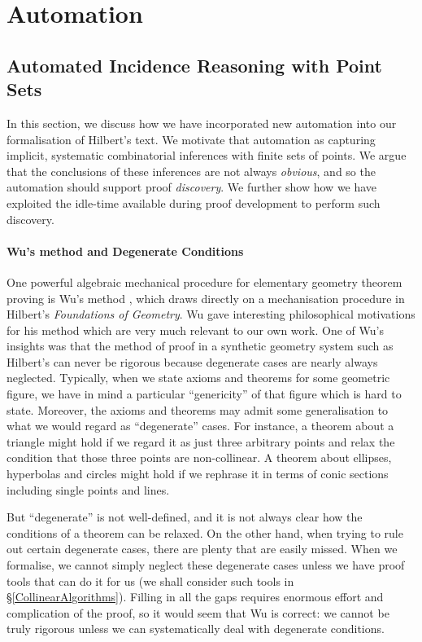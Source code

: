 \chapter{Automation}\label{chapter:Automation}
\section{Automated Incidence Reasoning with Point Sets}\label{sec:Incidence} 
In this section, we discuss how we have incorporated new automation into our formalisation of Hilbert's text. We motivate that automation as capturing implicit, systematic combinatorial inferences with finite sets of points. We argue that the conclusions of these inferences are not always \emph{obvious}, and so the automation should support proof \emph{discovery}. We further show how we have exploited the idle-time available during proof development to perform such discovery.

\subsubsection{Wu's method and Degenerate Conditions}\label{degeneracy}
One powerful algebraic mechanical procedure for elementary geometry theorem proving is Wu's method \cite{WuMechanicalTheoremProving}, which draws directly on a mechanisation procedure in Hilbert's \emph{Foundations of Geometry}. Wu gave interesting philosophical motivations for his method which are very much relevant to our own work. One of Wu's insights was that the method of proof in a synthetic geometry system such as Hilbert's can never be rigorous because degenerate cases are nearly always neglected. Typically, when we state axioms and theorems for some geometric figure, we have in mind a particular ``genericity'' of that figure which is hard to state. Moreover, the axioms and theorems may admit some generalisation to what we would regard as ``degenerate'' cases. For instance, a theorem about a triangle might hold if we regard it as just three arbitrary points and relax the condition that those three points are non-collinear. A theorem about ellipses, hyperbolas and circles might hold if we rephrase it in terms of conic sections including single points and lines. 

But ``degenerate'' is not well-defined, and it is not always clear how the conditions of a theorem can be relaxed. On the other hand, when trying to rule out certain degenerate cases, there are plenty that are easily missed. When we formalise, we cannot simply neglect these degenerate cases unless we have proof tools that can do it for us (we shall consider such tools in \S\ref{CollinearAlgorithms}). Filling in all the gaps requires enormous effort and complication of the proof, so it would seem that Wu is correct: we cannot be truly rigorous unless we can systematically deal with degenerate conditions. 


